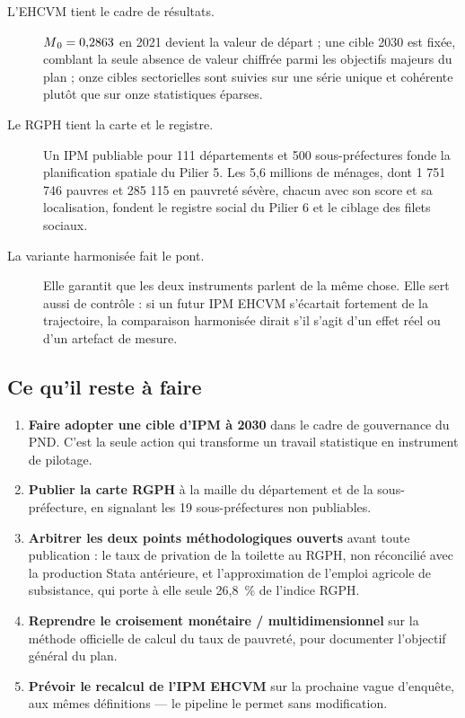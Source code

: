 \documentclass[11pt,a4paper]{article}
\begin{document}
\begin{description}
  \item[L'EHCVM tient le cadre de résultats.] $M\textsubscript{0} = 0{,}2863$ en 2021 devient la valeur de
    départ ; une cible 2030 est fixée, comblant la seule absence de valeur chiffrée parmi les
    objectifs majeurs du plan ; onze cibles sectorielles sont suivies sur une série unique et
    cohérente plutôt que sur onze statistiques éparses.

  \item[Le RGPH tient la carte et le registre.] Un IPM publiable pour 111 départements et 500
    sous-préfectures fonde la planification spatiale du Pilier 5. Les 5,6 millions de ménages, dont
    1 751 746 pauvres et 285 115 en pauvreté sévère, chacun avec son score et sa localisation,
    fondent le registre social du Pilier 6 et le ciblage des filets sociaux.

  \item[La variante harmonisée fait le pont.] Elle garantit que les deux instruments parlent de la
    même chose. Elle sert aussi de contrôle : si un futur IPM EHCVM s'écartait fortement de la
    trajectoire, la comparaison harmonisée dirait s'il s'agit d'un effet réel ou d'un artefact de
    mesure.
\end{description}

\subsection{Ce qu'il reste à faire}

\begin{enumerate}
  \item \textbf{Faire adopter une cible d'IPM à 2030} dans le cadre de gouvernance du PND. C'est la
        seule action qui transforme un travail statistique en instrument de pilotage.
  \item \textbf{Publier la carte RGPH} à la maille du département et de la sous-préfecture, en
        signalant les 19 sous-préfectures non publiables.
  \item \textbf{Arbitrer les deux points méthodologiques ouverts} avant toute publication : le taux
        de privation de la toilette au RGPH, non réconcilié avec la production Stata antérieure, et
        l'approximation de l'emploi agricole de subsistance, qui porte à elle seule 26,8~\% de
        l'indice RGPH.
  \item \textbf{Reprendre le croisement monétaire / multidimensionnel} sur la méthode officielle de
        calcul du taux de pauvreté, pour documenter l'objectif général du plan.
  \item \textbf{Prévoir le recalcul de l'IPM EHCVM} sur la prochaine vague d'enquête, aux mêmes
        définitions --- le pipeline le permet sans modification.
\end{enumerate}
\end{document}
